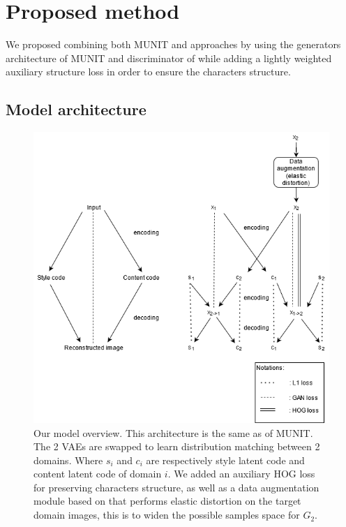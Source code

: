 \documentclass[12pt]{report}
\begin{document}
\section{Proposed method}

We proposed combining both MUNIT and \cite{ganimorph} approaches by using the generators architecture of MUNIT and discriminator of \cite{ganimorph} while adding a lightly weighted auxiliary structure loss in order to ensure the characters structure.

\subsection{Model architecture}

\begin{figure}[h]
	\centering
	\includegraphics[scale=0.8]{model-overview}
	\caption{Our model overview. This architecture is the same as of MUNIT. The 2 VAEs are swapped to learn distribution matching between 2 domains. Where $s_i$ and $c_i$ are respectively style latent code and content latent code of domain $i$. We added an auxiliary HOG loss for preserving characters structure, as well as a data augmentation module based on \cite{augmentor} that performs elastic distortion on the target domain images, this is to widen the possible samples space for $G_2$.}
	\label{fig:model-overview}
\end{figure}
\end{document}
